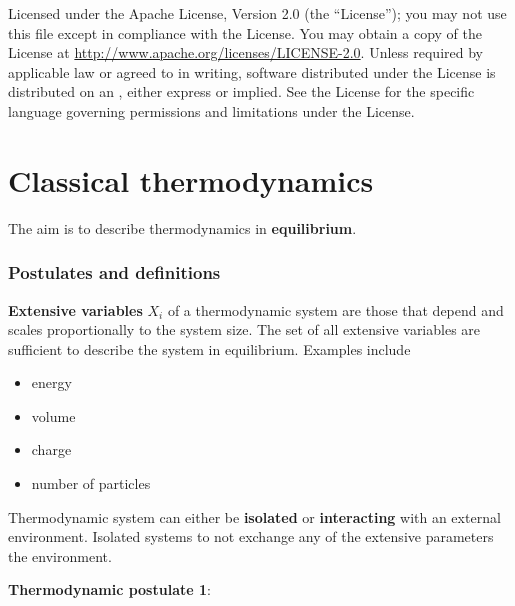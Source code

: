 \documentclass[letter-paper]{tufte-book}
\newcommand\Def[1]{\textbf{#1}}
\begin{document}
\begin{fullwidth}
\par

\par Licensed under the Apache License, Version 2.0 (the ``License''); you may not
use this file except in compliance with the License. You may obtain a copy
of the License at \url{http://www.apache.org/licenses/LICENSE-2.0}. Unless
required by applicable law or agreed to in writing, software distributed
under the License is distributed on an , either express or implied. See the
License for the specific language governing permissions and limitations
under the License.
\end{fullwidth}


\chapter{Classical thermodynamics}

The aim is to describe thermodynamics in \Def{equilibrium}.


\subsection{Postulates and definitions}

\Def{Extensive variables} $X_i$ of a thermodynamic system are those that depend
and scales proportionally to the system size. The set of all extensive variables
are sufficient to describe the system in equilibrium. Examples include
\begin{itemize}
  \item energy
  \item volume
  \item charge
  \item number of particles
\end{itemize}

Thermodynamic system can either be \Def{isolated} or \Def{interacting} with an
external environment. Isolated systems to not exchange any of the extensive
parameters the environment.

\vspace*{3mm}

\Def{Thermodynamic postulate 1}:
\end{document}
